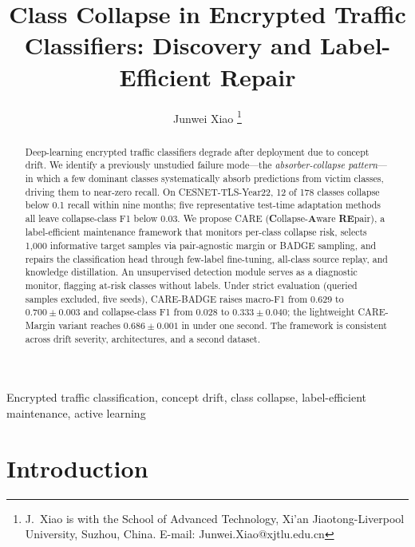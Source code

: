 \documentclass[journal]{IEEEtran}
\newcommand{\ours}{CARE}  %
\begin{document}
\title{Class Collapse in Encrypted Traffic Classifiers: Discovery and Label-Efficient Repair}

\author{
  Junwei Xiao
  \thanks{J.~Xiao is with the School of Advanced Technology, Xi'an Jiaotong-Liverpool University, Suzhou, China. E-mail: Junwei.Xiao@xjtlu.edu.cn}
}

\maketitle

\begin{abstract}
Deep-learning encrypted traffic classifiers degrade after deployment due to concept drift.
We identify a previously unstudied failure mode---the \textit{absorber-collapse pattern}---in which a few dominant classes systematically absorb predictions from victim classes, driving them to near-zero recall.
On CESNET-TLS-Year22, 12 of 178 classes collapse below 0.1 recall within nine months; five representative test-time adaptation methods all leave collapse-class F1 below 0.03.
We propose \ours{} (\textbf{C}ollapse-\textbf{A}ware \textbf{RE}pair), a label-efficient maintenance framework that monitors per-class collapse risk, selects 1{,}000 informative target samples via pair-agnostic margin or BADGE sampling, and repairs the classification head through few-label fine-tuning, all-class source replay, and knowledge distillation.
An unsupervised detection module serves as a diagnostic monitor, flagging at-risk classes without labels.
Under strict evaluation (queried samples excluded, five seeds), \ours{}-BADGE raises macro-F1 from 0.629 to $0.700{\pm}0.003$ and collapse-class F1 from 0.028 to $0.333{\pm}0.040$; the lightweight \ours{}-Margin variant reaches $0.686{\pm}0.001$ in under one second.
The framework is consistent across drift severity, architectures, and a second dataset.
\end{abstract}

\begin{IEEEkeywords}
Encrypted traffic classification, concept drift, class collapse, label-efficient maintenance, active learning
\end{IEEEkeywords}

\section{Introduction}
\label{sec:intro}
\end{document}

